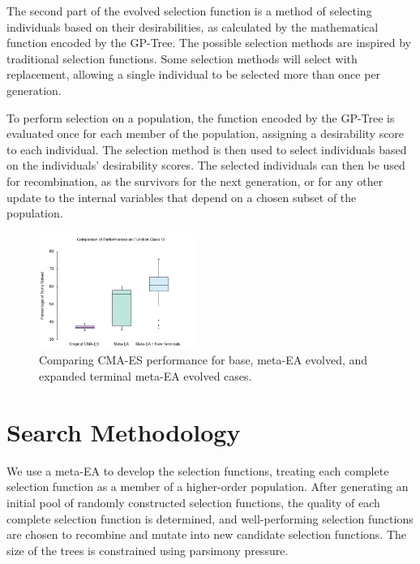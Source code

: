 \documentclass[sigconf]{acmart}
\begin{document}
The second part of the evolved selection function is a method of selecting individuals based on their desirabilities, as calculated by the mathematical function encoded by the GP-Tree. The possible selection methods are inspired by traditional selection functions. Some selection methods will select with replacement, allowing a single individual to be selected more than once per generation. 

To perform selection on a population, the function encoded by the GP-Tree is evaluated once for each member of the population, assigning a desirability score to each individual. The selection method is then used to select individuals based on the individuals' desirability scores. The selected individuals can then be used for recombination, as the survivors for the next generation, or for any other update to the internal variables that depend on a chosen subset of the population.


\begin{figure}
	\centering
	\includegraphics[width=0.45\textwidth]{terminalPerformanceComp}
	\caption{Comparing CMA-ES performance for base, meta-EA evolved, and expanded terminal meta-EA evolved cases.}
	\label{fig:terminalPerformanceComp}
\end{figure}

\section{Search Methodology}
\label{Search Methodology}

We use a meta-EA to develop the selection functions, treating each complete selection function as a member of a higher-order population. After generating an initial pool of randomly constructed selection functions, the quality of each complete selection function is determined, and well-performing selection functions are chosen to recombine and mutate into new candidate selection functions. The size of the trees is constrained using parsimony pressure.
\end{document}
